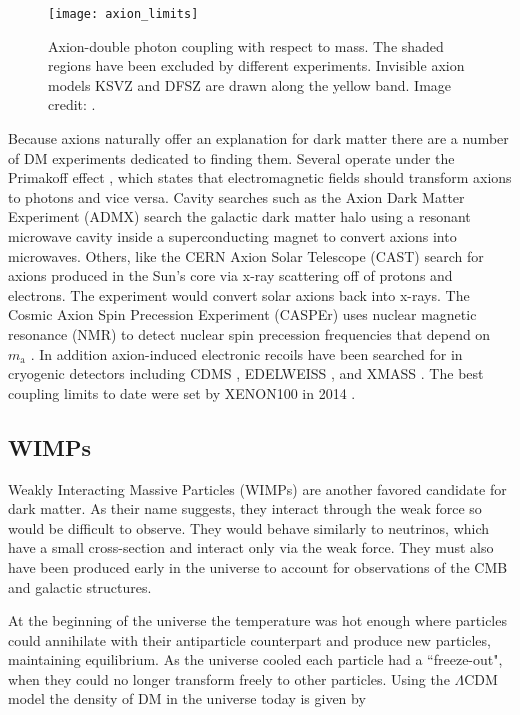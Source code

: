 \begin{figure}
\centering
\texttt{[image: axion\_limits]}
\caption{Axion-double photon coupling with respect to mass.  The shaded regions have been excluded by different experiments.  Invisible
axion models KSVZ and DFSZ are drawn along the yellow band.  Image credit: .}
\label{fig:axions}
\end{figure}


Because axions naturally offer an explanation for dark matter there are a number of DM experiments dedicated to
finding them.  Several operate under the Primakoff effect , which states that electromagnetic fields should
transform
axions to photons and vice versa.  Cavity searches such as the Axion Dark Matter Experiment (ADMX)  search the galactic
dark matter halo using a resonant microwave cavity inside a superconducting magnet
to convert axions into microwaves.  Others, like the CERN Axion Solar Telescope (CAST) search for axions produced in the Sun's
core via x-ray scattering off of protons and electrons.  The experiment would convert solar axions back into x-rays.  The Cosmic Axion
Spin Precession Experiment (CASPEr) uses nuclear magnetic resonance (NMR) to detect nuclear spin precession frequencies that depend on
$m_{\mathrm{a}}$ .  In addition axion-induced electronic recoils have been searched for in cryogenic detectors
including CDMS , EDELWEISS , and XMASS .  The best coupling limits to
date were set by XENON100 in 2014 .


\subsection{WIMPs} \label{subsec:wimps}
Weakly Interacting Massive Particles (WIMPs) are another favored candidate for dark matter.  As their name
suggests, they interact through the weak force so would be difficult to observe.  They
would behave similarly to neutrinos, which have a small cross-section and interact only via the weak force.  They must also have been
produced early in the universe to account for observations of the CMB and galactic structures.

At the beginning of the universe the temperature was hot enough where particles could annihilate with their
antiparticle counterpart and produce new particles, maintaining equilibrium.  As the universe cooled each
particle had a ``freeze-out", when they could no longer transform freely to other particles.  Using the
$\Lambda$CDM model the density of DM in the universe today is given by

